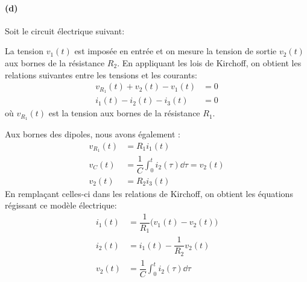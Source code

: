 \paragraph{(d)}
\begin{center}
    
\end{center}
\clearpage
Soit le circuit électrique suivant:
\begin{center}
    
\end{center}
La tension $v_1(t)$ est imposée en entrée et on mesure la tension de sortie 
$v_2(t)$ aux bornes de la résistance $R_2$.
En appliquant les lois de Kirchoff, on obtient les relations suivantes 
entre les tensions et les courants:
\begin{align*}
    v_{R_1}(t)+v_2(t)-v_1(t)&=0\\
    i_1(t)-i_2(t)-i_3(t)&=0
\end{align*}
où  $v_{R_1}(t)$ est la tension aux bornes de la résistance $R_1$.

Aux bornes des dipoles, nous avons également :
\begin{align*}
    v_{R_1}(t)&=R_1i_1(t)\\
    v_{C}(t)&=\dfrac{1}{C}\int_0^t i_2(\tau) \dd{\tau}=v_2(t)\\
    v_2(t)&=R_2i_3(t)
\end{align*}
En remplaçant celles-ci dans les relations de Kirchoff, on obtient les 
équations régissant ce modèle électrique:
\begin{align*}
    i_1(t)&=\dfrac{1}{R_1}\big(v_1(t)-v_2(t)\big)\\
    i_2(t)&=i_1(t)-\dfrac{1}{R_2}v_2(t)\\
    v_2(t)&=\dfrac{1}{C}\int_0^t i_2(\tau) \dd{\tau}
\end{align*}

